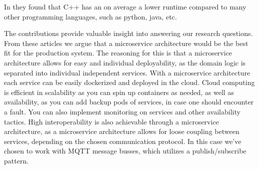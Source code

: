 In \cite{876288} they found that C++ has an on average a lower runtime compared to many other programming languages, such as python, java, etc.

The contributions provide valuable insight into answering our research questions. From these articles we argue that a microservice architecture would be the best fit for the production system. The reasoning for this is that a microservice architecture allows for easy and individual deployability, as the domain logic is separated into individual independent services. With a microservice architecture each service can be easily dockerized and deployed in the cloud. Cloud computing is efficient in scalability as you can spin up containers as needed, as well as availability, as you can add backup pods of services, in case one should encounter a fault. You can also implement monitoring on services and other availability tactics.
High interoperability is also achievable through a microservice architecture, as a microservice architecture allows for loose coupling between services, depending on the chosen communication protocol. In this case we've chosen to work with MQTT message busses, which utilizes a publish/subscribe pattern.